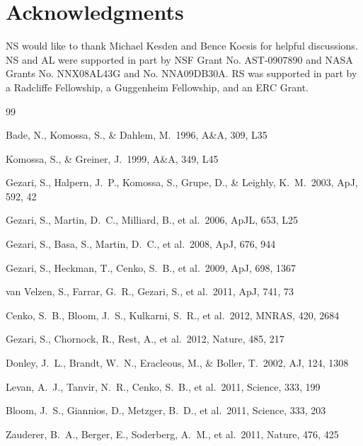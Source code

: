 \documentclass[useAMS, twocolumn, usenatbib]{mn2e}
\begin{document}
\section*{Acknowledgments}
NS would like to thank Michael Kesden and Bence Kocsis for helpful discussions.  NS and AL were supported in part by NSF Grant No. AST-0907890 and NASA Grants No. NNX08AL43G and No. NNA09DB30A.  RS was supported in part by a Radcliffe Fellowship, a Guggenheim Fellowship, and an ERC Grant.


\begin{thebibliography}{99}

 Bade, N., Komossa, S., \& Dahlem, M.\ 1996, A\&A, 309, L35 

 Komossa, S., \& Greiner, J.\ 1999, A\&A, 349, L45 

 Gezari, S., Halpern, 
J.~P., Komossa, S., Grupe, D., \& Leighly, K.~M.\ 2003, ApJ, 592, 42 

 Gezari, S., Martin, 
D.~C., Milliard, B., et al.\ 2006, ApJL, 653, L25 

 Gezari, S., Basa, S., 
Martin, D.~C., et al.\ 2008, ApJ, 676, 944 

 Gezari, S., Heckman, T., 
Cenko, S.~B., et al.\ 2009, ApJ, 698, 1367 

 van Velzen, S., 
Farrar, G.~R., Gezari, S., et al.\ 2011, ApJ, 741, 73 

 Cenko, S.~B., Bloom, 
J.~S., Kulkarni, S.~R., et al.\ 2012, MNRAS, 420, 2684 

 Gezari, S., Chornock, 
R., Rest, A., et al.\ 2012, Nature, 485, 217 

 Donley, J.~L., Brandt, 
W.~N., Eracleous, M., \& Boller, T.\ 2002, AJ, 124, 1308 

 Levan, A.~J., Tanvir, 
N.~R., Cenko, S.~B., et al.\ 2011, Science, 333, 199 

 Bloom, J.~S., Giannios, 
D., Metzger, B.~D., et al.\ 2011, Science, 333, 203 

 Zauderer, B.~A., 
Berger, E., Soderberg, A.~M., et al.\ 2011, Nature, 476, 425 


\end{thebibliography}
\end{document}
